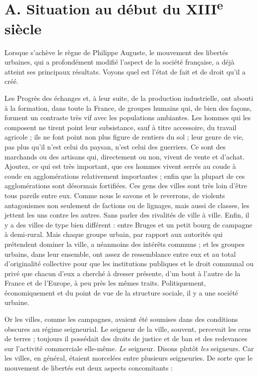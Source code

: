\documentclass[french,twoside]{book} %
\begin{document}
\section[A. Situation au début du XIIIe siècle]{A. Situation au début du XIII\textsuperscript{e} siècle}
\label{c08a}
\noindent  {}
\label{p71} Lorsque s’achève le règne de Philippe Auguste, le mouvement des libertés urbaines, qui a profondément modifié l’aspect de la société française, a déjà atteint ses principaux résultats. Voyons quel est l’état de fait et de droit qu’il a créé.\par
Les Progrès des échanges et, à leur suite, de la production industrielle, ont abouti à la formation, dans toute la France, de groupes humains qui, de bien des façons, forment un contraste très vif avec les populations ambiantes. Les hommes qui les composent ne tirent point leur subsistance, sauf à titre accessoire, du travail agricole ; ils ne font point non plus figure de rentiers du sol ; leur genre de vie, pas plus qu’il n’est celui du paysan, n’est celui des guerriers. Ce sont des marchands ou des artisans qui, directement ou non, vivent de vente et d’achat. Ajoutez, ce qui est très important, que ces hommes vivent serrés au coude à coude en agglomérations relativement importantes ; enfin que la plupart de ces agglomérations sont désormais fortifiées. Ces gens des villes sont très loin d’être tous pareils entre eux. Comme nous le savons et le reverrons, de violents antagonismes non seulement de factions ou de lignages, mais aussi de classes, les jettent les uns contre les autres. Sans parler des rivalités de ville à ville. Enfin, il y a des villes de type bien différent : entre Bruges et un petit bourg de campagne à demi-rural. Mais chaque groupe urbain, par rapport aux autorités qui  
\label{p72} prétendent dominer la ville, a néanmoins des intérêts communs ; et les groupes urbains, dans leur ensemble, ont assez de ressemblance entre eux et au total d’originalité collective pour que les institutions publiques et le droit communal ou privé que chacun d’eux a cherché à dresser présente, d’un bout à l’autre de la France et de l’Europe, à peu près les mêmes traits. Politiquement, économiquement et du point de vue de la structure sociale, il y a une société urbaine.\par
Or les villes, comme les campagnes, avaient été soumises dans des conditions obscures au régime seigneurial. Le seigneur de la ville, souvent, percevait les cens de terres ; toujours il possédait des droits de justice et de ban et des redevances sur l’activité commerciale elle-même. {\itshape Le} seigneur. Disons plutôt {\itshape les} seigneurs. Car les villes, en général, étaient morcelées entre plusieurs seigneuries. De sorte que le mouvement de libertés eut deux aspects concomitants :\par
\end{document}
